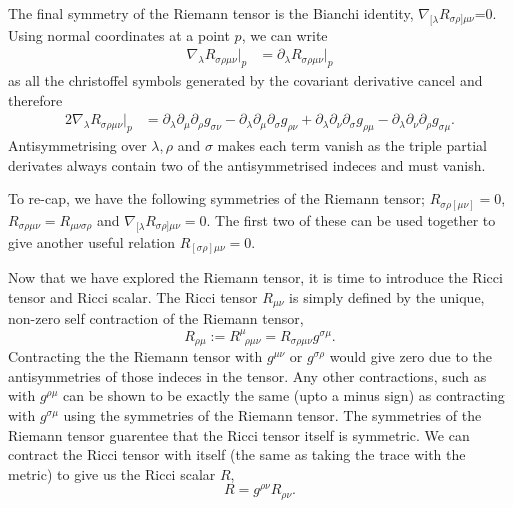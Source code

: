 The final symmetry of the Riemann tensor is the Bianchi identity, $\nabla_{[\lambda}R_{\sigma\rho]\mu\nu}$=0. Using normal coordinates at a point $p$, we can write
\begin{align}
\nabla_\lambda R_{\sigma\rho\mu\nu}\big|_p &= \partial_\lambda R_{\sigma\rho\mu\nu}\big|_p
\end{align}
as all the christoffel symbols generated by the covariant derivative cancel and therefore
\begin{align}
2\nabla_\lambda R_{\sigma\rho\mu\nu}\big|_p &= \partial_\lambda \partial_{\mu} \partial_\rho g_{\sigma\nu} - \partial_\lambda \partial_{\mu} \partial_\sigma g_{\rho\nu} + \partial_\lambda \partial_{\nu} \partial_\sigma g_{\rho\mu} - \partial_\lambda \partial_{\nu} \partial_\rho g_{\sigma\mu}.
\end{align}
Antisymmetrising over $\lambda,\rho$ and $\sigma$ makes each term vanish as the triple partial derivates always contain two of the antisymmetrised indeces and must vanish.

To re-cap, we have the following symmetries of the Riemann tensor; $R_{\sigma\rho[\mu\nu]}=0$, $R_{\sigma\rho\mu\nu}=R_{\mu\nu\sigma\rho}$ and $\nabla_{[\lambda}R_{\sigma\rho]\mu\nu}=0$. The first two of these can be used together to give another useful relation $R_{[\sigma\rho]\mu\nu} =0$.

Now that we have explored the Riemann tensor, it is time to introduce the Ricci tensor and Ricci scalar. The Ricci tensor $R_{\mu\nu}$ is simply defined by the unique, non-zero self contraction of the Riemann tensor,
\begin{equation}
R_{\rho\mu} := R^\mu_{\,\,\,\rho\mu\nu} = R_{\sigma\rho\mu\nu}g^{\sigma\mu}.
\end{equation}
Contracting the the Riemann tensor with $g^{\mu\nu}$ or $g^{\sigma\rho}$ would give zero due to the antisymmetries of those indeces in the tensor. Any other contractions, such as with $g^{\rho\mu}$ can be shown to be exactly the same (upto a minus sign) as contracting with $g^{\sigma \mu}$ using the symmetries of the Riemann tensor. The symmetries of the Riemann tensor guarentee that the Ricci tensor itself is symmetric. We can contract the Ricci tensor with itself (the same as taking the trace with the metric) to give us the Ricci scalar $R$,
\begin{equation}
R=g^{\rho\nu}R_{\rho\nu}.
\end{equation}

